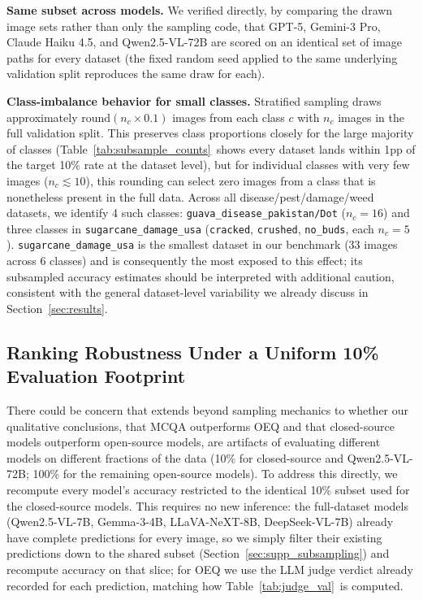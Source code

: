 \documentclass[10pt,letterpaper]{article}
\newcommand{\code}[1]{\texttt{#1}}
\begin{document}
\textbf{Same subset across models.} We verified directly, by comparing the drawn image sets rather than only the sampling code, that GPT-5, Gemini-3 Pro, Claude Haiku 4.5, and Qwen2.5-VL-72B are scored on an identical set of image paths for every dataset (the fixed random seed applied to the same underlying validation split reproduces the same draw for each).

\textbf{Class-imbalance behavior for small classes.} Stratified sampling draws approximately $\mathrm{round}(n_c \times 0.1)$ images from each class $c$ with $n_c$ images in the full validation split. This preserves class proportions closely for the large majority of classes (Table~\ref{tab:subsample_counts}\ shows every dataset lands within 1pp of the target 10\% rate at the dataset level), but for individual classes with very few images ($n_c \lesssim 10$), this rounding can select zero images from a class that is nonetheless present in the full data. Across all disease/pest/damage/weed datasets, we identify 4 such classes: \code{guava\_disease\_pakistan/Dot} ($n_c=16$) and three classes in \code{sugarcane\_damage\_usa} (\code{cracked}, \code{crushed}, \code{no\_buds}, each $n_c=5$). \code{sugarcane\_damage\_usa} is the smallest dataset in our benchmark (33 images across 6 classes) and is consequently the most exposed to this effect; its subsampled accuracy estimates should be interpreted with additional caution, consistent with the general dataset-level variability we already discuss in Section~\ref{sec:results}.

\subsection{Ranking Robustness Under a Uniform 10\% Evaluation Footprint}
\label{sec:supp_ranking}

There could be concern that extends beyond sampling mechanics to whether our qualitative conclusions, that MCQA outperforms OEQ and that closed-source models outperform open-source models, are artifacts of evaluating different models on different fractions of the data (10\% for closed-source and Qwen2.5-VL-72B; 100\% for the remaining open-source models). To address this directly, we recompute every model's accuracy restricted to the identical 10\% subset used for the closed-source models. This requires no new inference: the full-dataset models (Qwen2.5-VL-7B, Gemma-3-4B, LLaVA-NeXT-8B, DeepSeek-VL-7B) already have complete predictions for every image, so we simply filter their existing predictions down to the shared subset (Section~\ref{sec:supp_subsampling}) and recompute accuracy on that slice; for OEQ we use the LLM judge verdict already recorded for each prediction, matching how Table~\ref{tab:judge_val}\ is computed.
\end{document}
